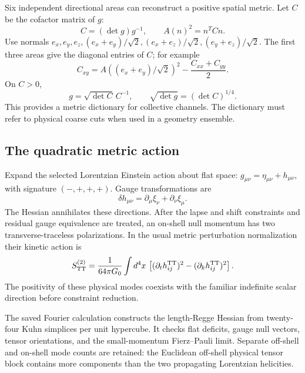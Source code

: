 Six independent directional areas can reconstruct a positive spatial metric. Let $C$ be the cofactor matrix of $g$:
\begin{equation}
C=(\det g)g^{-1},\qquad
A(n)^2=n^TCn.
\end{equation}
Use normals $e_x,e_y,e_z,(e_x+e_y)/\sqrt2,(e_x+e_z)/\sqrt2,(e_y+e_z)/\sqrt2$. The first three areas give the diagonal entries of $C$; for example
\begin{equation}
C_{xy}=A((e_x+e_y)/\sqrt2)^2-\frac{C_{xx}+C_{yy}}2.
\end{equation}
On $C>0$,
\begin{equation}
g=\sqrt{\det C}\,C^{-1},\qquad
\sqrt{\det g}=(\det C)^{1/4}.
\end{equation}
This provides a metric dictionary for collective channels. The dictionary must refer to physical coarse cuts when used in a geometry ensemble.

\subsection{The quadratic metric action}

Expand the selected Lorentzian Einstein action about flat space:
$g_{\mu\nu}=\eta_{\mu\nu}+h_{\mu\nu}$, with signature $(-,+,+,+)$.
Gauge transformations are
\begin{equation}
\delta h_{\mu\nu}=\partial_\mu\xi_\nu+\partial_\nu\xi_\mu.
\end{equation}
The Hessian annihilates these directions. After the lapse and shift constraints and residual gauge equivalence are treated, an on-shell null momentum has two transverse-traceless polarizations. In the usual metric perturbation normalization their kinetic action is
\begin{equation}
S_{\rm TT}^{(2)}
=\frac1{64\pi G_0}\int d^4x\,
\left[(\partial_t h_{ij}^{\rm TT})^2
-(\partial_kh_{ij}^{\rm TT})^2\right].
\end{equation}
The positivity of these physical modes coexists with the familiar indefinite scalar direction before constraint reduction.

The saved Fourier calculation constructs the length-Regge Hessian from twenty-four Kuhn simplices per unit hypercube. It checks flat deficits, gauge null vectors, tensor orientations, and the small-momentum Fierz--Pauli limit. Separate off-shell and on-shell mode counts are retained: the Euclidean off-shell physical tensor block contains more components than the two propagating Lorentzian helicities.

